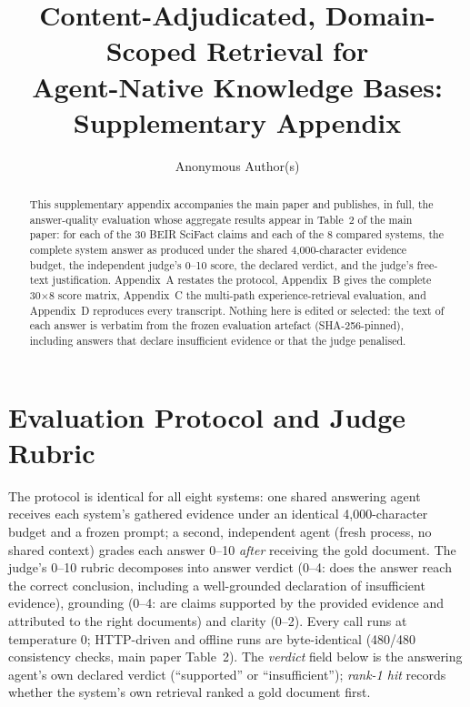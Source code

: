 \documentclass[sigconf, review, anonymous]{acmart}
\begin{document}
\title{Content-Adjudicated, Domain-Scoped Retrieval for\\ Agent-Native Knowledge Bases:\\ Supplementary Appendix}

\author{Anonymous Author(s)}

\begin{abstract}
This supplementary appendix accompanies the main paper and publishes, in
full, the answer-quality evaluation whose aggregate results appear in
Table~2 of the main paper: for each of the 30 BEIR SciFact claims and each
of the 8 compared systems, the complete system answer as produced under the
shared 4{,}000-character evidence budget, the independent judge's 0--10
score, the declared verdict, and the judge's free-text justification.
Appendix~A restates the protocol, Appendix~B gives the complete
30$\times$8 score matrix, Appendix~C the multi-path experience-retrieval
evaluation, and Appendix~D reproduces every transcript.
Nothing here is edited or selected: the text of each answer is verbatim
from the frozen evaluation artefact (SHA-256-pinned), including answers
that declare insufficient evidence or that the judge penalised.
\end{abstract}

\maketitle

\appendix

\section{Evaluation Protocol and Judge Rubric}\label{app:protocol}
The protocol is identical for all eight systems: one shared answering agent
receives each system's gathered evidence under an identical 4{,}000-character
budget and a frozen prompt; a second, independent agent (fresh process, no
shared context) grades each answer 0--10 \emph{after} receiving the gold
document. The judge's 0--10 rubric decomposes into answer verdict (0--4:
does the answer reach the correct conclusion, including a well-grounded
declaration of insufficient evidence), grounding (0--4: are claims supported
by the provided evidence and attributed to the right documents) and clarity
(0--2). Every call runs at temperature 0; HTTP-driven and offline runs are
byte-identical (480/480 consistency checks, main paper Table~2). The
\emph{verdict} field below is the answering agent's own declared verdict
(``supported'' or ``insufficient''); \emph{rank-1 hit} records whether the
system's own retrieval ranked a gold document first.
\end{document}

